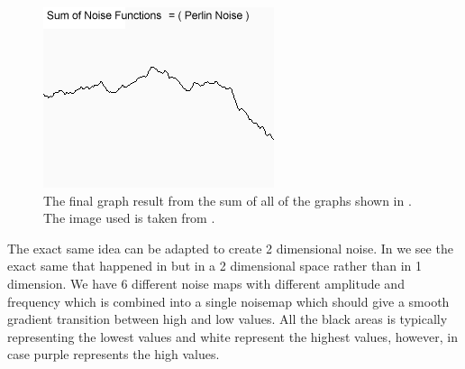 \begin{figure}[H]
	\includegraphics[width=0.5\linewidth]{img/perlin1}
	\centering
	\caption{The final graph result from the sum of all of the graphs shown in . The image used is taken from \cite{perlinnoise2}.}
	\label{fig:1DNoiseResult}
\end{figure}

The exact same idea can be adapted to create 2 dimensional noise. In  we see the exact same that happened in  but in a 2 dimensional space rather than in 1 dimension. We have 6 different noise maps with different amplitude and frequency which is combined into a single noisemap which should give a smooth gradient transition between high and low values. All the black areas is typically representing the lowest values and white represent the highest values, however, in  case purple represents the high values.

